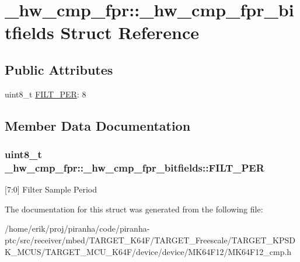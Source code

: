 \hypertarget{struct__hw__cmp__fpr_1_1__hw__cmp__fpr__bitfields}{}\section{\+\_\+hw\+\_\+cmp\+\_\+fpr\+:\+:\+\_\+hw\+\_\+cmp\+\_\+fpr\+\_\+bitfields Struct Reference}
\label{struct__hw__cmp__fpr_1_1__hw__cmp__fpr__bitfields}
\subsection*{Public Attributes}
\begin{DoxyCompactItemize}
\item 
uint8\+\_\+t \hyperlink{struct__hw__cmp__fpr_1_1__hw__cmp__fpr__bitfields_a081823319836e9322cf1e0f3f34c2530}{F\+I\+L\+T\+\_\+\+P\+ER}\+: 8
\end{DoxyCompactItemize}


\subsection{Member Data Documentation}
\subsubsection[{\texorpdfstring{F\+I\+L\+T\+\_\+\+P\+ER}{FILT_PER}}]{\setlength{\rightskip}{0pt plus 5cm}uint8\+\_\+t \+\_\+hw\+\_\+cmp\+\_\+fpr\+::\+\_\+hw\+\_\+cmp\+\_\+fpr\+\_\+bitfields\+::\+F\+I\+L\+T\+\_\+\+P\+ER}\hypertarget{struct__hw__cmp__fpr_1_1__hw__cmp__fpr__bitfields_a081823319836e9322cf1e0f3f34c2530}{}\label{struct__hw__cmp__fpr_1_1__hw__cmp__fpr__bitfields_a081823319836e9322cf1e0f3f34c2530}
\mbox{[}7\+:0\mbox{]} Filter Sample Period 

The documentation for this struct was generated from the following file\+:\begin{DoxyCompactItemize}
\item 
/home/erik/proj/piranha/code/piranha-\/ptc/src/receiver/mbed/\+T\+A\+R\+G\+E\+T\+\_\+\+K64\+F/\+T\+A\+R\+G\+E\+T\+\_\+\+Freescale/\+T\+A\+R\+G\+E\+T\+\_\+\+K\+P\+S\+D\+K\+\_\+\+M\+C\+U\+S/\+T\+A\+R\+G\+E\+T\+\_\+\+M\+C\+U\+\_\+\+K64\+F/device/device/\+M\+K64\+F12/M\+K64\+F12\+\_\+cmp.\+h\end{DoxyCompactItemize}
